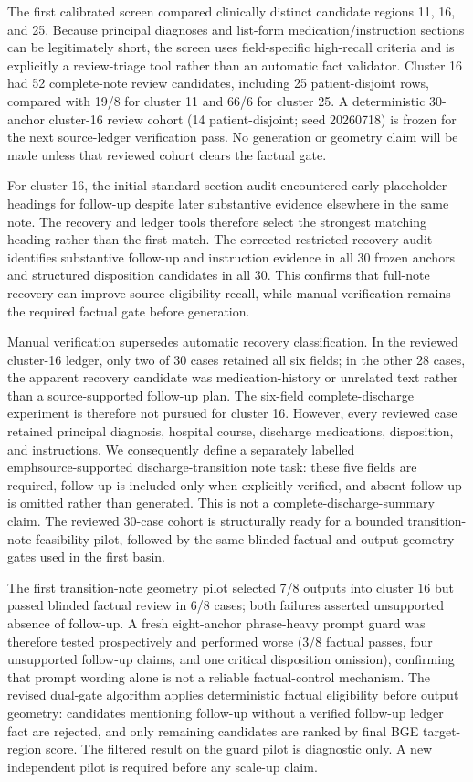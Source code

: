 \documentclass[11pt]{article}
\begin{document}
The first calibrated screen compared clinically distinct candidate regions 11, 16, and 25. Because principal diagnoses and list-form medication/instruction sections can be legitimately short, the screen uses field-specific high-recall criteria and is explicitly a review-triage tool rather than an automatic fact validator. Cluster 16 had 52 complete-note review candidates, including 25 patient-disjoint rows, compared with 19/8 for cluster 11 and 66/6 for cluster 25. A deterministic 30-anchor cluster-16 review cohort (14 patient-disjoint; seed 20260718) is frozen for the next source-ledger verification pass. No generation or geometry claim will be made unless that reviewed cohort clears the factual gate.

For cluster 16, the initial standard section audit encountered early placeholder headings for follow-up despite later substantive evidence elsewhere in the same note. The recovery and ledger tools therefore select the strongest matching heading rather than the first match. The corrected restricted recovery audit identifies substantive follow-up and instruction evidence in all 30 frozen anchors and structured disposition candidates in all 30. This confirms that full-note recovery can improve source-eligibility recall, while manual verification remains the required factual gate before generation.

Manual verification supersedes automatic recovery classification. In the reviewed cluster-16 ledger, only two of 30 cases retained all six fields; in the other 28 cases, the apparent recovery candidate was medication-history or unrelated text rather than a source-supported follow-up plan. The six-field complete-discharge experiment is therefore not pursued for cluster 16. However, every reviewed case retained principal diagnosis, hospital course, discharge medications, disposition, and instructions. We consequently define a separately labelled \\emph{source-supported discharge-transition note} task: these five fields are required, follow-up is included only when explicitly verified, and absent follow-up is omitted rather than generated. This is not a complete-discharge-summary claim. The reviewed 30-case cohort is structurally ready for a bounded transition-note feasibility pilot, followed by the same blinded factual and output-geometry gates used in the first basin.

The first transition-note geometry pilot selected 7/8 outputs into cluster 16 but passed blinded factual review in 6/8 cases; both failures asserted unsupported absence of follow-up. A fresh eight-anchor phrase-heavy prompt guard was therefore tested prospectively and performed worse (3/8 factual passes, four unsupported follow-up claims, and one critical disposition omission), confirming that prompt wording alone is not a reliable factual-control mechanism. The revised dual-gate algorithm applies deterministic factual eligibility before output geometry: candidates mentioning follow-up without a verified follow-up ledger fact are rejected, and only remaining candidates are ranked by final BGE target-region score. The filtered result on the guard pilot is diagnostic only. A new independent pilot is required before any scale-up claim.
\end{document}
